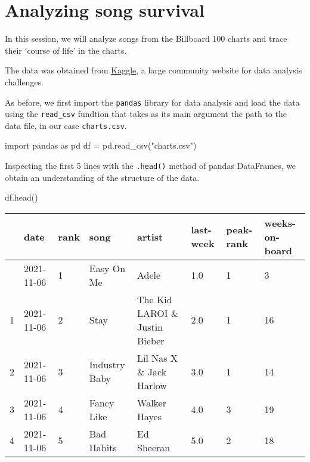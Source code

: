 \documentclass[
  a4paper,
]{scrbook}
\newenvironment{Shaded}{\begin{snugshade}}{\end{snugshade}}
\newcommand{\ImportTok}[1]{\textcolor[rgb]{0.00,0.46,0.62}{#1}}
\newcommand{\NormalTok}[1]{\textcolor[rgb]{0.00,0.23,0.31}{#1}}
\newcommand{\OperatorTok}[1]{\textcolor[rgb]{0.37,0.37,0.37}{#1}}
\newcommand{\StringTok}[1]{\textcolor[rgb]{0.13,0.47,0.30}{#1}}
\begin{document}
\chapter{Analyzing song survival}\label{analyzing-song-survival}

In this session, we will analyze songs from the Billboard 100 charts and
trace their `course of life' in the charts.

The data was obtained from
\href{https://www.kaggle.com/datasets/dhruvildave/billboard-the-hot-100-songs}{Kaggle},
a large community website for data analysis challenges.

As before, we first import the \texttt{pandas} library for data analysis
and load the data using the \texttt{read\_csv} fundtion that takes as
its main argument the path to the data file, in our case
\texttt{charts.csv}.

\begin{Shaded}
\begin{Highlighting}[]
\ImportTok{import}\NormalTok{ pandas }\ImportTok{as}\NormalTok{ pd}
\NormalTok{df }\OperatorTok{=}\NormalTok{ pd.read\_csv(}\StringTok{"charts.csv"}\NormalTok{)}
\end{Highlighting}
\end{Shaded}

Inspecting the first 5 lines with the \texttt{.head()} method of pandas
DataFrames, we obtain an understanding of the structure of the data.

\begin{Shaded}
\begin{Highlighting}[]
\NormalTok{df.head()}
\end{Highlighting}
\end{Shaded}

\begin{longtable}[]{@{}llllllll@{}}
\toprule\noalign{}
& date & rank & song & artist & last-week & peak-rank &
weeks-on-board \\
\midrule\noalign{}
\endhead
\bottomrule\noalign{}
\endlastfoot
0 & 2021-11-06 & 1 & Easy On Me & Adele & 1.0 & 1 & 3 \\
1 & 2021-11-06 & 2 & Stay & The Kid LAROI \& Justin Bieber & 2.0 & 1 &
16 \\
2 & 2021-11-06 & 3 & Industry Baby & Lil Nas X \& Jack Harlow & 3.0 & 1
& 14 \\
3 & 2021-11-06 & 4 & Fancy Like & Walker Hayes & 4.0 & 3 & 19 \\
4 & 2021-11-06 & 5 & Bad Habits & Ed Sheeran & 5.0 & 2 & 18 \\
\end{longtable}
\end{document}
